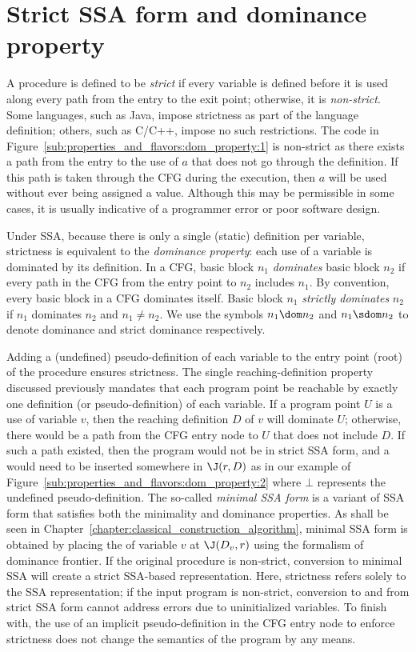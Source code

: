 \section{Strict SSA form and dominance property}
\label{sec:properties_and_flavours:domprop}
A procedure is defined to be \emph{strict} if every variable is defined before it is used along every path from the entry to the exit point; 
otherwise, it is \emph{non-strict}. 
Some languages, such as Java, impose strictness as part of the language definition; 
others, such as C/C++, impose no such restrictions. 
The code in Figure~\ref{sub:properties_and_flavors:dom_property:1} is non-strict as there exists a path from the entry to the use of $a$ that does not go through the definition. 
If this path is taken through the CFG during the execution, then $a$ will be used without ever being assigned a value. 
Although this may be permissible in some cases, it is usually indicative of a programmer error or poor software design.

Under SSA, because there is only a single (static) definition per variable, strictness is equivalent to the \emph{dominance property}: 
each use of a variable is dominated by its definition. 
In a CFG, basic block $n_{1}$ \emph{dominates} basic block $n_{2}$ if every path in the CFG from the entry point to $n_{2}$ includes $n_{1}$. 
By convention, every basic block in a CFG dominates itself. 
Basic block $n_{1}$ \emph{strictly dominates} $n_{2}$ if $n_{1}$ dominates $n_{2}$ and $n_{1} \neq n_{2}$. 
We use the symbols $n_{1} \dom n_{2}$ and $n_{1} \sdom n_{2}$ to denote dominance and strict dominance respectively.


Adding a (undefined) pseudo-definition of each variable to the entry point (root) of the procedure ensures strictness. 
The single reaching-definition property discussed previously mandates that each program point be reachable by exactly one definition (or pseudo-definition) of each variable. 
If a program point $U$ is a use of variable $v$, then the reaching definition $D$ of $v$ will dominate $U$; 
otherwise, there would be a path from the CFG entry node to $U$ that does not include $D$. 
If such a path existed, then the program would not be in strict SSA form, and a \phifun would need to be inserted somewhere in $\J(r,D)$ as in our example of Figure~\ref{sub:properties_and_flavors:dom_property:2} where $\bot$ represents the undefined pseudo-definition. 
The so-called \emph{minimal SSA form} is a variant of SSA form that satisfies both the minimality and dominance properties. 
As shall be seen in Chapter~\ref{chapter:classical_construction_algorithm}, minimal SSA form is obtained by placing the \phifuns of variable $v$ at $\J(D_v,r)$ using the formalism of dominance frontier. 
If the original procedure is non-strict, conversion to minimal SSA will create a strict SSA-based representation. 
Here, strictness refers solely to the SSA representation; 
if the input program is non-strict, conversion to and from strict SSA form cannot address errors due to uninitialized variables. 
To finish with, the use of an implicit pseudo-definition in the CFG entry node to enforce strictness does not change the semantics of the program by any means.


